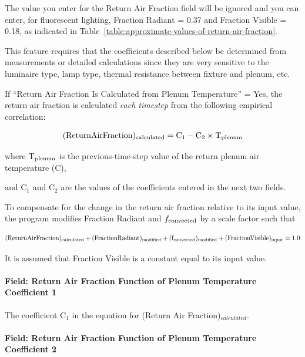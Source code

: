 The value you enter for the Return Air Fraction field will be ignored and you can enter, for fluorescent lighting, Fraction Radiant = 0.37 and Fraction Visible = 0.18, as indicated in Table~\ref{table:approximate-values-of-return-air-fraction}.

This feature requires that the coefficients described below be determined from measurements or detailed calculations since they are very sensitive to the luminaire type, lamp type, thermal resistance between fixture and plenum, etc.

If ``Return Air Fraction Is Calculated from Plenum Temperature'' = Yes, the return air fraction is calculated \emph{each timestep} from the following empirical correlation:

\begin{equation}
  (\rm{Return Air Fraction})_{\rm{calculated}} = C_{1} - C_{2} \times T_{\rm{plenum}}
\end{equation}

where T\(_{\rm{plenum}}\) is the previous-time-step value of the return plenum air temperature (C),

and C\(_{1}\) and C\(_{2}\) are the values of the coefficients entered in the next two fields.

To compensate for the change in the return air fraction relative to its input value, the program modifies Fraction Radiant and \(f_{\rm{convected}}\) by a scale factor such that

\begin{equation}
  (\rm{Return Air Fraction})_{\rm{calculated}} + (\rm{Fraction Radiant})_{\rm{modified}} + (f_{\rm{convected}})_{\rm{modified}} + (\rm{Fraction Visible})_{\rm{input}} = 1.0
\end{equation}

It is assumed that Fraction Visible is a constant equal to its input value.

\paragraph{Field: Return Air Fraction Function of Plenum Temperature Coefficient 1}\label{field-return-air-fraction-function-of-plenum-temperature-coefficient-1}

The coefficient C\(_{1}\) in the equation for (Return Air Fraction)\(_{calculated}\).

\paragraph{Field: Return Air Fraction Function of Plenum Temperature Coefficient 2}\label{field-return-air-fraction-function-of-plenum-temperature-coefficient-2}

